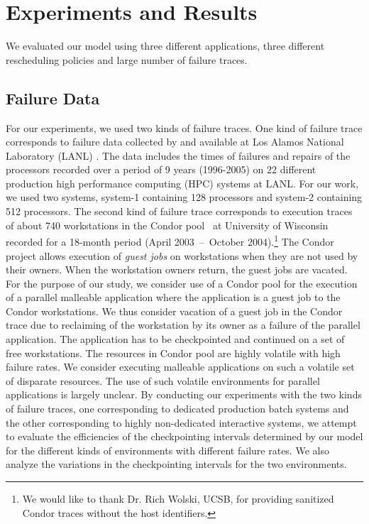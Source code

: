 \documentclass[conference,10pt]{IEEEtran}
\begin{document}
\section{Experiments and Results}
\label{experiments}

We evaluated our model using three
different applications, three different rescheduling policies and large
number of failure traces. 

\subsection{Failure Data}

For our experiments, we used two kinds of failure traces. One kind of
failure trace corresponds to failure data collected by and available
at Los Alamos National Laboratory (LANL) \cite{lanlfailuredata}. The
data includes the times of failures and repairs of the processors
recorded over a period of 9 years (1996-2005) on 22 different
production high performance computing (HPC) systems at LANL. For our
work, we used two systems, system-1 containing 128 processors and
system-2 containing 512 processors. The second kind of failure trace
corresponds to execution traces of about 740 workstations in the
Condor pool~\cite{condor-web} at University of Wisconsin recorded for
a 18-month period (April 2003~--~October 2004).\footnote{We would like
  to thank Dr. Rich Wolski, UCSB, for providing sanitized Condor
  traces without the host identifiers.} The Condor
project allows execution of {\em guest jobs} on
workstations when they are not used by their owners. When the
workstation owners return, the guest jobs are vacated. For the purpose
of our study, we consider use of a Condor pool for the execution of a
parallel malleable application where the application is a guest job to
the Condor workstations. We thus consider vacation of a guest job in
the Condor trace due to reclaiming of the workstation by its owner as
a failure of the parallel application. The application has to be
checkpointed and continued on a set of free workstations. The
resources in Condor pool are highly volatile with high failure
rates. We consider executing malleable applications on such a volatile
set of disparate resources. The use of such volatile environments for
parallel applications is largely unclear. By conducting our
experiments with the two kinds of failure traces, one corresponding to
dedicated production batch systems and the other corresponding to
highly non-dedicated interactive systems, we attempt to evaluate the
efficiencies of the checkpointing intervals determined by our model
for the different kinds of environments with different failure
rates. We also analyze the variations in the checkpointing intervals
for the two environments.
\end{document}
